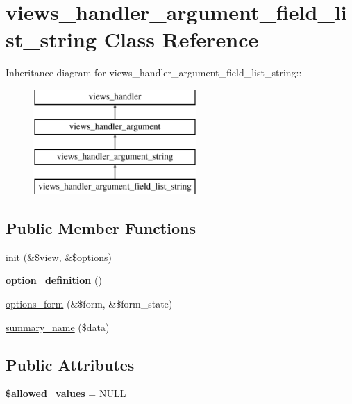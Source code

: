 \hypertarget{classviews__handler__argument__field__list__string}{
\section{views\_\-handler\_\-argument\_\-field\_\-list\_\-string Class Reference}
\label{classviews__handler__argument__field__list__string}
}
Inheritance diagram for views\_\-handler\_\-argument\_\-field\_\-list\_\-string::\begin{figure}[H]
\begin{center}
\leavevmode
\includegraphics[height=4cm]{classviews__handler__argument__field__list__string}
\end{center}
\end{figure}
\subsection*{Public Member Functions}
\begin{DoxyCompactItemize}
\item 
\hyperlink{classviews__handler__argument__field__list__string_a3f56fc3681ce2363758ab69821b74885}{init} (\&\$\hyperlink{classview}{view}, \&\$options)
\item 
\hypertarget{classviews__handler__argument__field__list__string_a5d6d188ac355e711ba0f786117a8012c}{
{\bfseries option\_\-definition} ()}
\label{classviews__handler__argument__field__list__string_a5d6d188ac355e711ba0f786117a8012c}

\item 
\hyperlink{classviews__handler__argument__field__list__string_a4e4a9d1fc93be565b57059152d21ae03}{options\_\-form} (\&\$form, \&\$form\_\-state)
\item 
\hyperlink{classviews__handler__argument__field__list__string_a02abc27f8dfd06bd5c6f9e24860afe9c}{summary\_\-name} (\$data)
\end{DoxyCompactItemize}
\subsection*{Public Attributes}
\begin{DoxyCompactItemize}
\item 
\hypertarget{classviews__handler__argument__field__list__string_a5481d3258ecfe626c3eb30cb407c4039}{
{\bfseries \$allowed\_\-values} = NULL}
\label{classviews__handler__argument__field__list__string_a5481d3258ecfe626c3eb30cb407c4039}

\end{DoxyCompactItemize}


